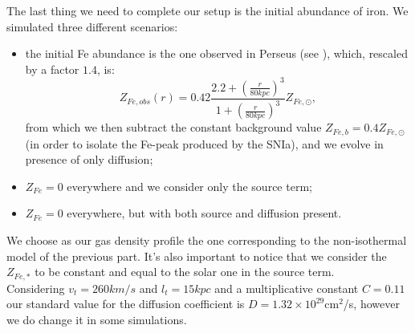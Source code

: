\documentclass{article}
\begin{document}
The last thing we need to complete our setup is the initial abundance of iron. We simulated three different scenarios:
\begin{itemize}
	\item the initial Fe abundance is the one observed in Perseus (see \cite{rebusco}), which, rescaled by a factor $1.4$, is:
			\begin{equation}\label{Feab}
				Z_{Fe,obs}(r)=0.42\frac{2.2+(\frac{r}{80 kpc})^{3}}{1+(\frac{r}{80 kpc})^{3}}Z_{Fe,\odot},
			\end{equation}
			from which we then subtract the constant background value $Z_{Fe,b}=0.4Z_{Fe,\odot}$ (in order to isolate the Fe-peak produced by the SNIa), and we evolve in presence of only diffusion;
	\item  $Z_{Fe}=0$ everywhere and we consider only the source term;
	\item  $Z_{Fe}=0$ everywhere, but with both source and diffusion present.
\end{itemize}
We choose as our gas density profile the one corresponding to the non-isothermal model of the previous part. It's also important to notice that we consider the $Z_{Fe,*}$ to be constant and equal to the solar one in the source term.\\
Considering $v_{t}=260 km/s$ and $l_{t}=15kpc$ and a multiplicative constant $C=0.11$ our standard value for the diffusion coefficient is $D=1.32\times 10^{29}$cm$^{2}$/s, however we do change it in some simulations.
\end{document}
